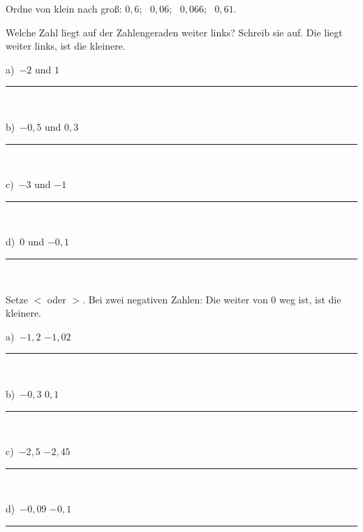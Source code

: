 \documentclass[11pt]{article}
\providecommand{\linie}[1]{\,{\color{black!45}\rule[-1pt]{#1}{0.4pt}}\,}
\newcommand{\aufg}[3]{\par\noindent\makebox[0pt][r]{#3}\begin{minipage}[t]{\linewidth}#1\end{minipage}\par}
\newcommand{\nr}[1]{\makebox[7mm][l]{\textbf{#1}}}
\begin{document}
\medskip
\aufg{\nr{A3}Ordne von klein nach groß: $0{,}6$; \ $0{,}06$; \ $0{,}066$; \ $0{,}61$.}{}{{\scriptsize\color{mbgrau}Ziel\hspace{2mm}}}
\medskip
\par\Needspace{25mm}\noindent\colorbox{black!12}{}\hspace{2mm}{\bfseries Negative Zahlen vergleichen}\par\smallskip
\aufg{\nr{B1}\begin{minipage}[t]{\dimexpr\linewidth-7mm\relax}Welche Zahl liegt auf der Zahlengeraden weiter links? Schreib sie auf. Die liegt weiter links, ist die kleinere.\par\smallskip
\noindent\begin{minipage}[t]{0.48\linewidth}\raggedright
a)\ $-2$ und $1$\linie{25mm}
\end{minipage}\hfill
\begin{minipage}[t]{0.48\linewidth}\raggedright
b)\ $-0{,}5$ und $0{,}3$\linie{25mm}
\end{minipage}\par\smallskip
\noindent\begin{minipage}[t]{0.48\linewidth}\raggedright
c)\ $-3$ und $-1$\linie{25mm}
\end{minipage}\hfill
\begin{minipage}[t]{0.48\linewidth}\raggedright
d)\ $0$ und $-0{,}1$\linie{25mm}
\end{minipage}\par\smallskip\end{minipage}}{}{}
\medskip
\aufg{\nr{B2}\begin{minipage}[t]{\dimexpr\linewidth-7mm\relax}Setze $<$ oder $>$. Bei zwei negativen Zahlen: Die weiter von 0 weg ist, ist die kleinere.\par\smallskip
\noindent\begin{minipage}[t]{0.48\linewidth}\raggedright
a)\ $-1{,}2$ \fbox{\phantom{$<$}} $-1{,}02$\linie{25mm}
\end{minipage}\hfill
\begin{minipage}[t]{0.48\linewidth}\raggedright
b)\ $-0{,}3$ \fbox{\phantom{$<$}} $0{,}1$\linie{25mm}
\end{minipage}\par\smallskip
\noindent\begin{minipage}[t]{0.48\linewidth}\raggedright
c)\ $-2{,}5$ \fbox{\phantom{$<$}} $-2{,}45$\linie{25mm}
\end{minipage}\hfill
\begin{minipage}[t]{0.48\linewidth}\raggedright
d)\ $-0{,}09$ \fbox{\phantom{$<$}} $-0{,}1$\linie{25mm}
\end{minipage}\par\smallskip\end{minipage}}{}{}
\end{document}
